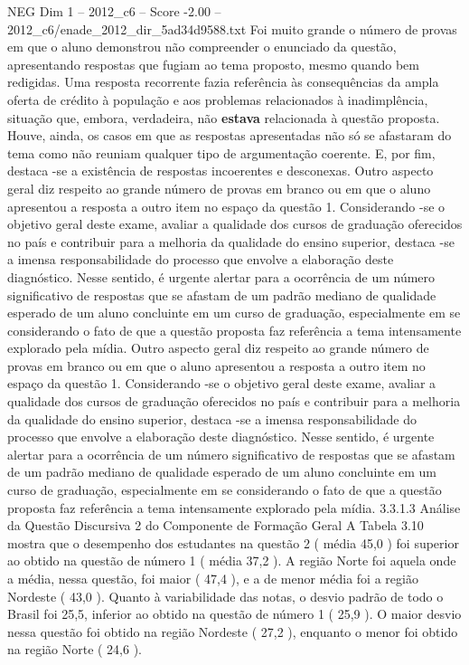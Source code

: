 \begin{textsample}{NEG Dim 1 – 2012\_c6 – Score -2.00 – 2012\_c6/enade\_2012\_dir\_5ad34d9588.txt}
Foi muito grande o número de provas em que o aluno demonstrou não compreender o enunciado da questão, apresentando respostas que fugiam ao tema proposto, mesmo quando bem redigidas.
Uma resposta recorrente fazia referência às consequências da ampla oferta de crédito à população e aos problemas relacionados à inadimplência, situação que, embora, verdadeira, não \textbf{estava} relacionada à questão proposta.
Houve, ainda, os casos em que as respostas apresentadas não só se afastaram do tema como não reuniam qualquer tipo de argumentação coerente.
E, por fim, destaca -se a existência de respostas incoerentes e desconexas.
Outro aspecto geral diz respeito ao grande número de provas em branco ou em que o aluno apresentou a resposta a outro item no espaço da questão 1.
Considerando -se o objetivo geral deste exame, avaliar a qualidade dos cursos de graduação oferecidos no país e contribuir para a melhoria da qualidade do ensino superior, destaca -se a imensa responsabilidade do processo que envolve a elaboração deste diagnóstico.
Nesse sentido, é urgente alertar para a ocorrência de um número significativo de respostas que se afastam de um padrão mediano de qualidade esperado de um aluno concluinte em um curso de graduação, especialmente em se considerando o fato de que a questão proposta faz referência a tema intensamente explorado pela mídia.
Outro aspecto geral diz respeito ao grande número de provas em branco ou em que o aluno apresentou a resposta a outro item no espaço da questão 1.
Considerando -se o objetivo geral deste exame, avaliar a qualidade dos cursos de graduação oferecidos no país e contribuir para a melhoria da qualidade do ensino superior, destaca -se a imensa responsabilidade do processo que envolve a elaboração deste diagnóstico.
Nesse sentido, é urgente alertar para a ocorrência de um número significativo de respostas que se afastam de um padrão mediano de qualidade esperado de um aluno concluinte em um curso de graduação, especialmente em se considerando o fato de que a questão proposta faz referência a tema intensamente explorado pela mídia. 3.3.1.3 Análise da Questão Discursiva 2 do Componente de Formação Geral A Tabela 3.10 mostra que o desempenho dos estudantes na questão 2 ( média 45,0 ) foi superior ao obtido na questão de número 1 ( média 37,2 ).
A região Norte foi aquela onde a média, nessa questão, foi maior ( 47,4 ), e a de menor média foi a região Nordeste ( 43,0 ).
Quanto à variabilidade das notas, o desvio padrão de todo o Brasil foi 25,5, inferior ao obtido na questão de número 1 ( 25,9 ).
O maior desvio nessa questão foi obtido na região Nordeste ( 27,2 ), enquanto o menor foi obtido na região Norte ( 24,6 ).

\end{textsample}
